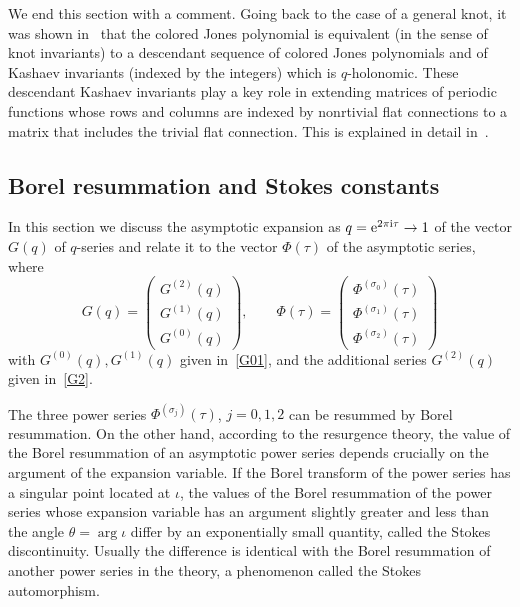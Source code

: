 \documentclass[12pt,reqno]{amsart}
\theoremstyle{definition}
\def\s{\sigma}
\def\ri{\mathrm{i}}
\def\re{{\rm e}}
\def\ri{{\rm i}}
\begin{document}
We end this section with a comment. 
Going back to the case of a general knot, it was shown in~\cite{GK:desc} that
the colored Jones polynomial is equivalent (in the sense of knot invariants) to
a descendant sequence of colored Jones polynomials and of Kashaev invariants
(indexed by the integers) which is $q$-holonomic. These descendant Kashaev invariants
play a key role in extending matrices of periodic functions whose rows and columns are
indexed by nonrtivial flat connections to a matrix that includes the trivial flat
connection. This is explained in detail in~\cite{GZ:kashaev}.
  
\subsection{Borel resummation and Stokes constants}
\label{sub.41borel}

In this section we discuss the asymptotic expansion as
$q = \re^{2\pi\ri\tau}\rightarrow 1$ of the vector $G(q)$ of $q$-series
and relate it to the vector $\Phi(\tau)$ of the asymptotic series,
where 
\begin{equation}
  G(q) =
  \begin{pmatrix}
    G^{(2)}(q) \\
    G^{(1)}(q) \\
    G^{(0)}(q)
  \end{pmatrix}, \qquad
  \Phi(\tau) =
  \begin{pmatrix}
    \Phi^{(\s_0)}(\tau)\\
    \Phi^{(\s_1)}(\tau)\\
    \Phi^{(\s_2)}(\tau)
  \end{pmatrix}
  \label{eq:Gq}
\end{equation}
with $G^{(0)}(q), G^{(1)}(q)$ given in~\eqref{G01}, and the
additional series $G^{(2)}(q)$ given in~\eqref{G2}.

The three power series $\Phi^{(\s_j)}(\tau)$, $j=0,1,2$ can be
resummed by Borel resummation.  On the other hand, according to the
resurgence theory, the value of the Borel resummation of an asymptotic
power series depends crucially on the argument of the expansion
variable.  If the Borel transform of the power series has a singular
point located at $\iota$, the values of the Borel resummation of the
power series whose expansion variable has an argument slightly greater
and less than the angle $\theta = \arg \iota$ differ by an
exponentially small quantity, called the Stokes discontinuity. Usually
the difference is identical with the Borel resummation of another
power series in the theory, a phenomenon called the Stokes
automorphism.
\end{document}
